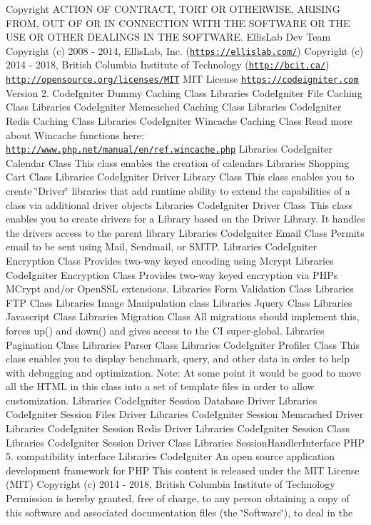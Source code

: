 \begin{DoxyCopyright}{Copyright}
A\+C\+T\+I\+ON OF C\+O\+N\+T\+R\+A\+CT, T\+O\+RT OR O\+T\+H\+E\+R\+W\+I\+SE, A\+R\+I\+S\+I\+NG F\+R\+OM, O\+UT OF OR IN C\+O\+N\+N\+E\+C\+T\+I\+ON W\+I\+TH T\+HE S\+O\+F\+T\+W\+A\+RE OR T\+HE U\+SE OR O\+T\+H\+ER D\+E\+A\+L\+I\+N\+GS IN T\+HE S\+O\+F\+T\+W\+A\+RE.  Ellis\+Lab Dev Team  Copyright (c) 2008 -\/ 2014, Ellis\+Lab, Inc. (\href{https://ellislab.com/}{\tt https\+://ellislab.\+com/})  Copyright (c) 2014 -\/ 2018, British Columbia Institute of Technology (\href{http://bcit.ca/}{\tt http\+://bcit.\+ca/})  \href{http://opensource.org/licenses/MIT}{\tt http\+://opensource.\+org/licenses/\+M\+IT} M\+IT License  \href{https://codeigniter.com}{\tt https\+://codeigniter.\+com}  Version 2.  Code\+Igniter Dummy Caching Class  Libraries Code\+Igniter File Caching Class  Libraries Code\+Igniter Memcached Caching Class  Libraries Code\+Igniter Redis Caching Class  Libraries Code\+Igniter Wincache Caching Class Read more about Wincache functions here\+: \href{http://www.php.net/manual/en/ref.wincache.php}{\tt http\+://www.\+php.\+net/manual/en/ref.\+wincache.\+php}  Libraries Code\+Igniter Calendar Class This class enables the creation of calendars  Libraries Shopping Cart Class  Libraries Code\+Igniter Driver Library Class This class enables you to create \char`\"{}\+Driver\char`\"{} libraries that add runtime ability to extend the capabilities of a class via additional driver objects  Libraries Code\+Igniter Driver Class This class enables you to create drivers for a Library based on the Driver Library. It handles the drivers\textquotesingle{} access to the parent library  Libraries Code\+Igniter Email Class Permits email to be sent using Mail, Sendmail, or S\+M\+TP.  Libraries Code\+Igniter Encryption Class Provides two-\/way keyed encoding using Mcrypt  Libraries Code\+Igniter Encryption Class Provides two-\/way keyed encryption via P\+HP\textquotesingle{}s M\+Crypt and/or Open\+S\+SL extensions.  Libraries Form Validation Class  Libraries F\+TP Class  Libraries Image Manipulation class  Libraries Jquery Class  Libraries Javascript Class  Libraries Migration Class All migrations should implement this, forces up() and down() and gives access to the CI super-\/global.  Libraries Pagination Class  Libraries Parser Class  Libraries Code\+Igniter Profiler Class This class enables you to display benchmark, query, and other data in order to help with debugging and optimization. Note\+: At some point it would be good to move all the H\+T\+ML in this class into a set of template files in order to allow customization.  Libraries Code\+Igniter Session Database Driver  Libraries Code\+Igniter Session Files Driver  Libraries Code\+Igniter Session Memcached Driver  Libraries Code\+Igniter Session Redis Driver  Libraries Code\+Igniter Session Class  Libraries Code\+Igniter Session Driver Class  Libraries Session\+Handler\+Interface P\+HP 5. compatibility interface  Libraries Code\+Igniter An open source application development framework for P\+HP This content is released under the M\+IT License (M\+IT) Copyright (c) 2014 -\/ 2018, British Columbia Institute of Technology Permission is hereby granted, free of charge, to any person obtaining a copy of this software and associated documentation files (the \char`\"{}\+Software\char`\"{}), to deal in the 
\end{DoxyCopyright}
